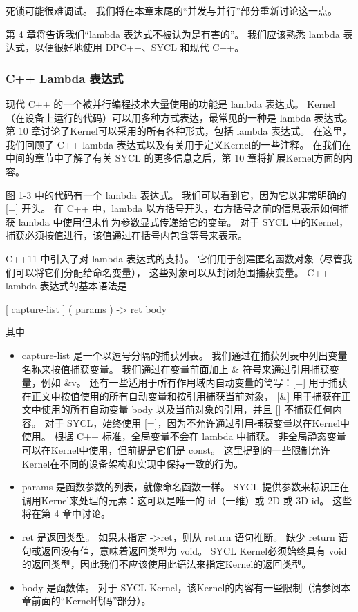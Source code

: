 死锁可能很难调试。 我们将在本章末尾的“并发与并行”部分重新讨论这一点。

\begin{remark}
	第 4 章将告诉我们“lambda 表达式不被认为是有害的”。 
	我们应该熟悉 lambda 表达式，以便很好地使用 DPC++、SYCL 和现代 C++。
\end{remark}

\subsubsection{C++ Lambda 表达式}
现代 C++ 的一个被并行编程技术大量使用的功能是 lambda 表达式。 
Kernel（在设备上运行的代码）可以用多种方式表达，最常见的一种是 lambda 表达式。 
第 10 章讨论了Kernel可以采用的所有各种形式，包括 lambda 表达式。 
在这里，我们回顾了 C++ lambda 表达式以及有关用于定义Kernel的一些注释。 
在我们在中间的章节中了解了有关 SYCL 的更多信息之后，第 10 章将扩展Kernel方面的内容。

图 1-3 中的代码有一个 lambda 表达式。 我们可以看到它，因为它以非常明确的 [=] 开头。 
在 C++ 中，lambda 以方括号开头，右方括号之前的信息表示如何捕获 lambda 中使用但未作为参数显式传递给它的变量。 
对于 SYCL 中的Kernel，捕获必须按值进行，该值通过在括号内包含等号来表示。

C++11 中引入了对 lambda 表达式的支持。 它们用于创建匿名函数对象（尽管我们可以将它们分配给命名变量），
这些对象可以从封闭范围捕获变量。 C++ lambda 表达式的基本语法是

[ capture-list ] ( params ) -> ret { body }


其中

\begin{itemize}
	\item capture-list 是一个以逗号分隔的捕获列表。 我们通过在捕获列表中列出变量名称来按值捕获变量。 
	我们通过在变量前面加上 \& 符号来通过引用捕获变量，例如 \&v。 
	还有一些适用于所有作用域内自动变量的简写：[=] 用于捕获在正文中按值使用的所有自动变量和按引用捕获当前对象，
	[\&] 用于捕获在正文中使用的所有自动变量 body 以及当前对象的引用，并且 [] 不捕获任何内容。 
	对于 SYCL，始终使用 [=]，因为不允许通过引用捕获变量以在Kernel中使用。 
	根据 C++ 标准，全局变量不会在 lambda 中捕获。 
	非全局静态变量可以在Kernel中使用，但前提是它们是 const。 
	这里提到的一些限制允许Kernel在不同的设备架构和实现中保持一致的行为。

	\item params 是函数参数的列表，就像命名函数一样。 
	SYCL 提供参数来标识正在调用Kernel来处理的元素：这可以是唯一的 id（一维）或 2D 或 3D id。 
	这些将在第 4 章中讨论。

	\item ret 是返回类型。 如果未指定 ->ret，则从 return 语句推断。
	缺少 return 语句或返回没有值，意味着返回类型为 void。 
	SYCL Kernel必须始终具有 void 的返回类型，因此我们不应该使用此语法来指定Kernel的返回类型。

	\item body 是函数体。 对于 SYCL Kernel，该Kernel的内容有一些限制（请参阅本章前面的“Kernel代码”部分）。
\end{itemize}

